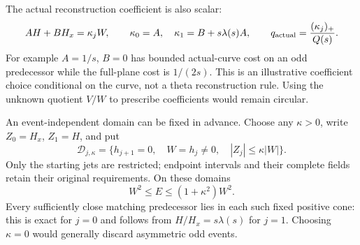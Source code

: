 \documentclass[11pt]{article}
\numberwithin{equation}{section}
\theoremstyle{definition}
\theoremstyle{remark}
\begin{document}
The actual reconstruction coefficient is also scalar:
\begin{equation}
 AH+BH_x=\kappa_jW,\qquad
 \kappa_0=A,\quad\kappa_1=B+s\lambda(s)A,
 \qquad q_{\rm actual}=\frac{(\kappa_j)_+}{Q(s)}.
 \label{obs:actual-scalar-cost}
\end{equation}
For example $A=1/s$, $B=0$ has bounded actual-curve cost on an odd
predecessor while the full-plane cost is $1/(2s)$.
This is an illustrative coefficient choice conditional on the curve,
not a theta reconstruction rule. Using the unknown quotient $V/W$
to prescribe coefficients would remain circular.

An event-independent domain can be fixed in advance. Choose any
$\kappa>0$, write $Z_0=H_x$, $Z_1=H$, and put
\begin{equation}
 \mathcal D_{j,\kappa}
 =\{h_{j+1}=0,\quad W=h_j\ne0,\quad |Z_j|\le\kappa|W|\}.
 \label{obs:prescribed-cone}
\end{equation}
Only the starting jets are restricted; endpoint intervals and their
complete fields retain their original requirements.
On these domains
\begin{equation}
 W^2\le E\le(1+\kappa^2)W^2.
 \label{obs:cone-energy-comparison}
\end{equation}
Every sufficiently close matching predecessor lies in each such fixed
positive cone: this is exact for $j=0$ and follows from
$H/H_x=s\lambda(s)$ for $j=1$.
Choosing $\kappa=0$ would generally discard asymmetric odd events.
\end{document}
